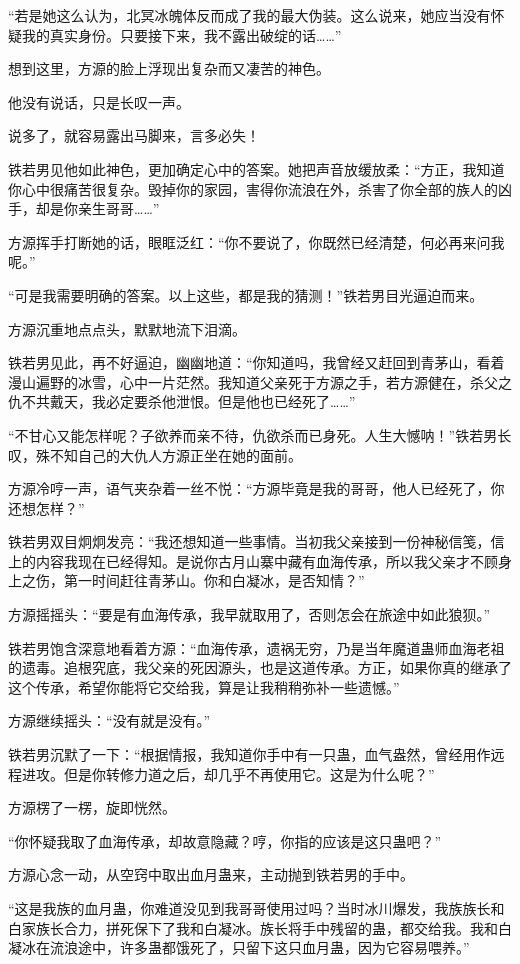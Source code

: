 \begin{this_body}
“若是她这么认为，北冥冰魄体反而成了我的最大伪装。这么说来，她应当没有怀疑我的真实身份。只要接下来，我不露出破绽的话……”

想到这里，方源的脸上浮现出复杂而又凄苦的神色。

他没有说话，只是长叹一声。

说多了，就容易露出马脚来，言多必失！

铁若男见他如此神色，更加确定心中的答案。她把声音放缓放柔：“方正，我知道你心中很痛苦很复杂。毁掉你的家园，害得你流浪在外，杀害了你全部的族人的凶手，却是你亲生哥哥……”

方源挥手打断她的话，眼眶泛红：“你不要说了，你既然已经清楚，何必再来问我呢。”

“可是我需要明确的答案。以上这些，都是我的猜测！”铁若男目光逼迫而来。

方源沉重地点点头，默默地流下泪滴。

铁若男见此，再不好逼迫，幽幽地道：“你知道吗，我曾经又赶回到青茅山，看着漫山遍野的冰雪，心中一片茫然。我知道父亲死于方源之手，若方源健在，杀父之仇不共戴天，我必定要杀他泄恨。但是他也已经死了……”

“不甘心又能怎样呢？子欲养而亲不待，仇欲杀而已身死。人生大憾呐！”铁若男长叹，殊不知自己的大仇人方源正坐在她的面前。

方源冷哼一声，语气夹杂着一丝不悦：“方源毕竟是我的哥哥，他人已经死了，你还想怎样？”

铁若男双目炯炯发亮：“我还想知道一些事情。当初我父亲接到一份神秘信笺，信上的内容我现在已经得知。是说你古月山寨中藏有血海传承，所以我父亲才不顾身上之伤，第一时间赶往青茅山。你和白凝冰，是否知情？”

方源摇摇头：“要是有血海传承，我早就取用了，否则怎会在旅途中如此狼狈。”

铁若男饱含深意地看着方源：“血海传承，遗祸无穷，乃是当年魔道蛊师血海老祖的遗毒。追根究底，我父亲的死因源头，也是这道传承。方正，如果你真的继承了这个传承，希望你能将它交给我，算是让我稍稍弥补一些遗憾。”

方源继续摇头：“没有就是没有。”

铁若男沉默了一下：“根据情报，我知道你手中有一只蛊，血气盎然，曾经用作远程进攻。但是你转修力道之后，却几乎不再使用它。这是为什么呢？”

方源楞了一楞，旋即恍然。

“你怀疑我取了血海传承，却故意隐藏？哼，你指的应该是这只蛊吧？”

方源心念一动，从空窍中取出血月蛊来，主动抛到铁若男的手中。

“这是我族的血月蛊，你难道没见到我哥哥使用过吗？当时冰川爆发，我族族长和白家族长合力，拼死保下了我和白凝冰。族长将手中残留的蛊，都交给我。我和白凝冰在流浪途中，许多蛊都饿死了，只留下这只血月蛊，因为它容易喂养。”


\end{this_body}
